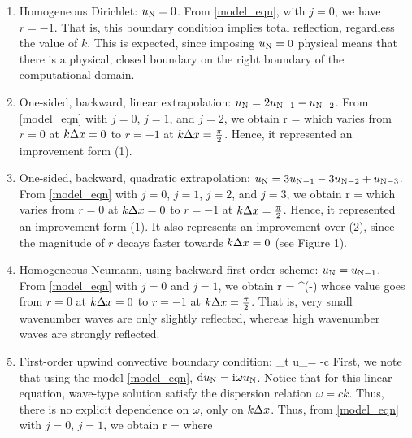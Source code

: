 \documentclass[11pt]{article}
\begin{document}
\begin{enumerate}

    \item Homogeneous Dirichlet: $u_{\mathrm{N}} = 0$.
        From \eqref{model_eqn}, with $j=0$, we have $r = -1$. That is, this boundary condition
        implies total reflection, regardless the value of $k$. This is expected, since imposing
        $u_{\mathrm{N}}=0$ physical means that there is a physical, closed boundary on the right boundary
        of the computational domain. 
   
    \item One-sided, backward, linear extrapolation: $u_{\mathrm{N}} = 2 u_{\mathrm{N}-1} - u_{\mathrm{N}-2}$. From \eqref{model_eqn}
         with $j=0$, $j=1$, and $j=2$, we obtain
        \beq
            r = \com
        \eeq
        which varies from $r=0$ at $k\Delta x=0$ to $r=-1$ at $k\Delta x = \tfrac{\pi}{2}$. Hence, it represented an 
        improvement form (1).

    \item One-sided, backward, quadratic extrapolation: $u_{\mathrm{N}} = 3 u_{\mathrm{N}-1}-3 u_{\mathrm{N}-2}+ u_{\mathrm{N}-3}$. From \eqref{model_eqn} with $j=0$, $j=1$, $j=2$, and $j=3$,  we obtain
        \beq
        r = \com 
        \eeq
        which varies from $r=0$ at $k\Delta x=0$ to $r=-1$ at $k\Delta x = \tfrac{\pi}{2}$. Hence, it represented an 
        improvement form (1). It also represents an improvement over (2), since the magnitude of $r$ decays
        faster towards $k \Delta x = 0$ (see Figure 1).

    \item Homogeneous Neumann, using backward first-order scheme: $u_{\mathrm{N}} = u_{\mathrm{N}-1}$. From \eqref{model_eqn}
         with $j=0$ and $j=1$, we obtain
         \beq
            r = \ee^{\ii\left(-\right)}\tan {}\com
         \eeq
         whose value goes from $r=0$ at $k\Delta x = 0$ to $r=-1$ at $k\Delta x=\tfrac{\pi}{2}$. That is, very small wavenumber
         waves are only slightly reflected, whereas high wavenumber waves are strongly reflected. 

    \item First-order upwind convective boundary condition:
        \beq
            \dd_t u_\nmax = -c\per
        \eeq
        First, we note that using the model \eqref{model_eqn}, ${\rm d} u_{\mathrm{N}} = {\rm i} \omega u_{\mathrm{N}}$. Notice that for this linear equation, wave-type solution satisfy the dispersion relation $\omega = c k$. Thus, there is no explicit dependence on $\omega$, only on $k \Delta x$. 
         Thus, from \eqref{model_eqn} with $j=0$, $j=1$, we obtain
         \beq
            r = \com
         \eeq
         where
         \beq
            \gamma {} {}\per
         \eeq


\end{enumerate}
\end{document}
